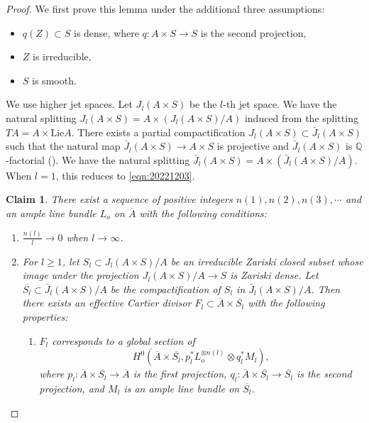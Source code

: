 \documentclass[11pt,english]{smfart}
\theoremstyle{plain}
\newtheorem{claim}[thm]{Claim}
\theoremstyle{definition}
\theoremstyle{remark}
\numberwithin{equation}{section}
\theoremstyle{plain}
\begin{document}
	\begin{proof}
		We first prove this lemma under the additional three assumptions:
		\begin{itemize}
			\item
			$q(Z)\subset S$ is dense, where $q:A\times S\to S$ is the second projection,
			\item
			$Z$ is irreducible,
			
			\item
			$S$ is smooth.
		\end{itemize}
		
		We use higher jet spaces.
		Let $J_l(A\times S)$ be the $l$-th jet space.
		We have the natural splitting $J_l(A\times S)=A\times (J_l(A\times S)/A)$ induced from the splitting $TA=A\times\mathrm{Lie}A$.
		There exists a partial compactification $J_l(A\times S)\subset \bar{J}_l(A\times S)$ such that the natural map $\bar{J}_l(A\times S)\to A\times S$ is projective and $\bar{J}_l(A\times S)$ is $\mathbb Q$-factorial (\cite[2.4]{Yam04}).	
		We have the natural splitting $\bar{J}_l(A\times S)=A\times (\bar{J}_l(A\times S)/A)$.
		When $l=1$, this reduces to \eqref{eqn:20221203}.
		
		
		\begin{claim}\label{claim:20221021}
			There exist a sequence of positive integers $n(1),n(2),n(3),\cdots$ and an ample line bundle $L_o$ on $\overline{A}$ with the following conditions:
			\renewcommand{\labelenumi}{(\theenumi )}
			\begin{enumerate}
				\item $\frac{n(l)}{l}\to 0 $ when $l\to \infty$.
				\item For $l\geq 1$, let $S_l\subset J_l(A\times S)/A$ be an irreducible Zariski closed subset whose
				image under the projection $J_l(A\times S)/A\to S$ is Zariski dense.
				Let $\overline{S_l}\subset \bar{J}_l(A\times S)/A$ be the compactification of $S_l$ in $\bar{J}_l(A\times S)/A$.
				Then there exists an effective Cartier divisor $F_l\subset \overline{A}\times \overline{S_l}$ with the following properties:
				\begin{enumerate}
					\item $F_l$ corresponds to a global section of
					$$H^0(\overline{A}\times \overline{S_l},p_l^*L_o^{\otimes n(l)}\otimes q _l^*M_l),$$
					where $p_l:\overline{A}\times \overline{S_l}\to \overline{A}$ is the first projection, $q _l:\overline{A}\times \overline{S_l}\to \overline{S_l}$ is the second projection, and $M_l$ is an ample line bundle on $\overline{S_l}$.
					

\end{enumerate}
\end{enumerate}
\end{claim}
\end{proof}
\end{document}
